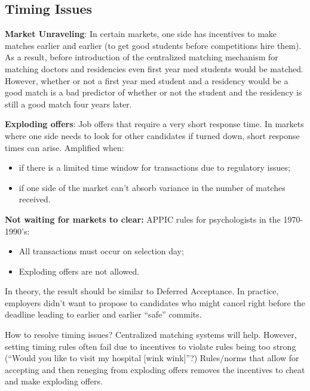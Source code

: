 \documentclass[dvipsnames]{article}
\theoremstyle{definition}
\theoremstyle{remark}
\begin{document}
\subsection{Timing Issues}

\textbf{Market Unraveling}: In certain markets, one side has incentives to make matches earlier and earlier (to get good students before competitions hire them). As a result, before introduction of the centralized matching mechanism for matching doctors and residencies even first year med students would be matched. However, whether or not a first year med student and a residency would be a good match is a bad predictor of whether or not the student and the residency is still a good match four years later.

\textbf{Exploding offers}: Job offers that require a very short response time. In markets where one side needs to look for other candidates if turned down, short response times can arise. Amplified when:
\begin{itemize}
	\item if there is a limited time window for transactions due to regulatory issues;
	\item if one side of the market can't absorb variance in the number of matches received. 
\end{itemize}

\textbf{Not waiting for markets to clear:} APPIC rules for psychologists in the 1970-1990's: 
\begin{itemize}
	\item All transactions must occur on selection day;
	\item Exploding offers are not allowed. 
\end{itemize}
In theory, the result should be similar to Deferred Acceptance. In practice, employers didn't want to propose to candidates who might cancel right before the deadline leading to earlier and earlier ``safe'' commits.

How to resolve timing issues? Centralized matching systems will help. However, setting timing rules often fail due to incentives to violate rules being too strong (``Would you like to visit my hospital [wink wink]''?) Rules/norms that allow for accepting and then reneging from exploding offers removes the incentives to cheat and make exploding offers. 
\end{document}

